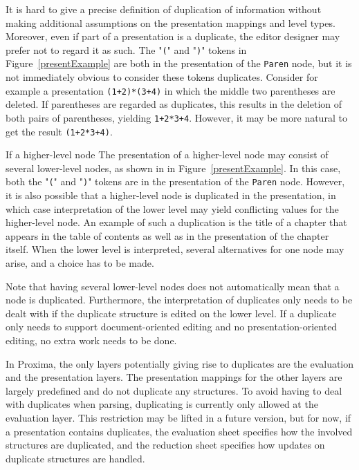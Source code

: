 It is hard to give a precise definition of duplication of information without making additional assumptions on the presentation mappings and level types. Moreover, even if part of a presentation is a duplicate, the editor designer may prefer not to regard it as such. The "\verb|(|" and "\verb|)|" tokens in Figure~\ref{presentExample} are both in the presentation of the \verb|Paren| node, but it is not immediately obvious to consider these tokens duplicates. Consider for example a presentation \verb|(1+2)*(3+4)| in which the middle two parentheses are deleted. If parentheses are regarded as duplicates, this results in the deletion of both pairs of parentheses, yielding \verb|1+2*3+4|. However, it may be more natural to get the result \verb|(1+2*3+4)|.


\bc
If a higher-level node The presentation of a higher-level node may consist of several lower-level nodes, as shown in in Figure~\ref{presentExample}. In this case, both the "\verb|(|" and "\verb|)|" tokens are in the presentation of the \verb|Paren| node. However, it is also possible that a higher-level node is duplicated in the presentation, in which case interpretation of the lower level may yield conflicting values for the higher-level node. An example of such a duplication is the title of a chapter that appears in the table of contents as well as in the presentation of the chapter itself. When the lower level is interpreted, several alternatives for one node may arise, and a choice has to be made.

Note that having several lower-level nodes does not automatically mean that a node is duplicated. Furthermore, the interpretation of duplicates only needs to be dealt with if the duplicate structure is edited on the lower level. If a duplicate only needs to support document-oriented editing and no presentation-oriented editing, no extra work needs to be done.
\ec

In Proxima, the only layers potentially giving rise to duplicates are the evaluation and the presentation layers. The presentation mappings for the other layers are largely predefined and do not duplicate any structures. 
\bc To avoid having to deal with duplicates when parsing, duplicating is currently only allowed at the evaluation layer. This restriction may be lifted in a future version, but for now, if a presentation contains duplicates, the evaluation sheet specifies how the involved structures are duplicated, and the reduction sheet specifies how updates on duplicate structures are handled.
\ec

